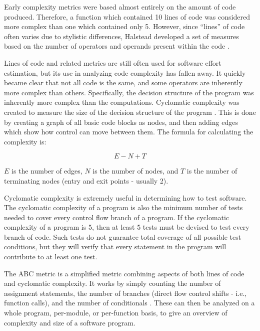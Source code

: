 Early complexity metrics were based almost entirely on the amount of code produced.  Therefore, a function which contained 10 lines of code was considered more complex than one which contained only 5.  However, since ``lines'' of code often varies due to stylistic differences, Halstead developed a set of measures based on the number of operators and operands present within the code \citep*{kearney}.

Lines of code and related metrics are still often used for software effort estimation, but its use in analyzing code complexity has fallen away.  It quickly became clear that not all code is the same, and some operators are inherently more complex than others.  Specifically, the decision structure of the program was inherently more complex than the computations.  Cyclomatic complexity was created to measure the size of the decision structure of the program \citep{mccabe}.  This is done by creating a graph of all basic code blocks as nodes, and then adding edges which show how control can move between them.  The formula for calculating the complexity is:

\begin{equation}
E - N + T
\end{equation}

$E$ is the number of edges, $N$ is the number of nodes, and $T$ is the number of terminating nodes (entry and exit points - usually 2).   

Cyclomatic complexity is extremely useful in determining how to test software.  The cyclomatic complexity of a program is also the minimum number of tests needed to cover every control flow branch of a program.  If the cyclomatic complexity of a program is 5, then at least 5 tests must be devised to test every branch of code.  Such tests do not guarantee total coverage of all possible test conditions, but they will verify that every statement in the program will contribute to at least one test.

The ABC metric is a simplified metric combining aspects of both lines of code and cyclomatic complexity.  It works by simply counting the number of assignment statements, the number of branches (direct flow control shifts - i.e., function calls), and the number of conditionals \citep[pp.~2--3]{fitzpatrick}.  These can then be analyzed on a whole program, per-module, or per-function basis, to give an overview of complexity and size of a software program.

